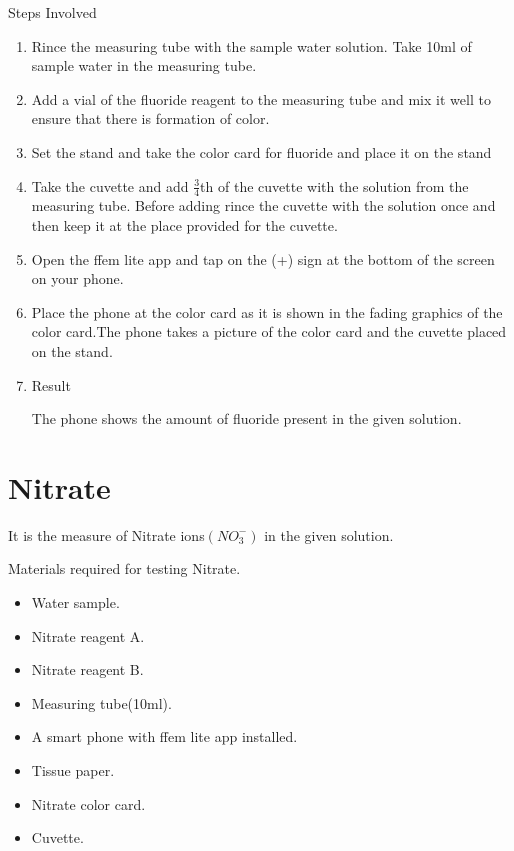 \documentclass{article}
\begin{document}
 \begin{large}
 Steps Involved 
 \end{large}
 
 \begin{enumerate}
 \item Rince the measuring tube with the sample water solution.
 Take 10ml of sample water in the measuring tube.
 \item Add a vial of the fluoride reagent to the measuring tube and mix it well to ensure that there is formation of color.
 \item Set the stand and take the color card for fluoride and place it on the stand 
 \item Take the cuvette and add $\frac{3}{4}$th of the cuvette with the solution from the measuring tube. Before adding rince the cuvette with the solution once and then keep it at the place provided for the cuvette.
 
 \item Open the ffem lite app and tap on the (+) sign at the bottom of the screen on your phone.
 \item Place the phone at the color card as it is shown in the fading graphics of the color card.The phone takes a picture of the color card and the cuvette placed on the stand.
 \item Result 
 
 The phone shows the amount of fluoride present in the given solution.
 
 \end{enumerate}
    


    \section{Nitrate}
    
    It is the measure of Nitrate ions$(NO_3^-)$ in the given solution.
    
     Materials required for testing Nitrate.
  \begin{itemize}
  \item Water sample.
  \item  Nitrate reagent A.
  \item Nitrate reagent B.
  \item Measuring tube(10ml).
  \item A smart phone with ffem lite app installed.
  \item Tissue paper.
  \item  Nitrate color card.
  \item  Cuvette.
  \end{itemize}
\end{document}
